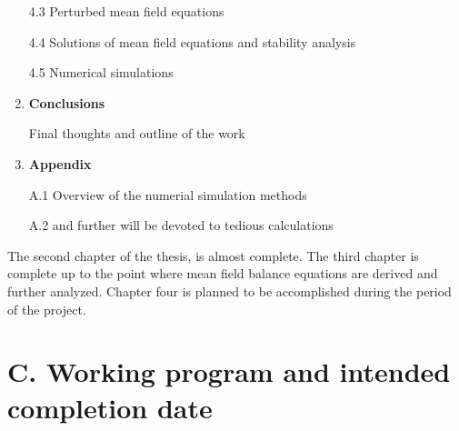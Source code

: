 \documentclass[11pt, notitlepage]{article} %
\begin{document}
\begin{enumerate}
		4.3 Perturbed mean field equations

		4.4 Solutions of mean field equations and stability analysis

		4.5 Numerical simulations

	\item \textbf{Conclusions}

		Final thoughts and outline of the work 

	\item \textbf{Appendix}

		A.1 Overview of the numerial simulation methods

		A.2 and further will be devoted to tedious calculations
	
\end{enumerate}

The second chapter of the thesis, is almost complete. The third chapter is complete up to the point where mean field 
balance equations are derived and further analyzed. Chapter four is planned to be accomplished during the period of the project.



\newpage
\section*{C. Working program and intended completion date}
\end{document}
